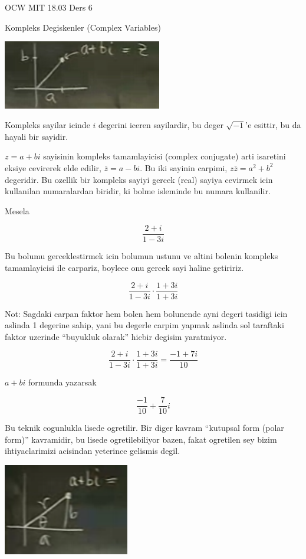 \documentclass[12pt,fleqn]{article}
\begin{document}
OCW MIT 18.03 Ders 6

Kompleks Degiskenler (Complex Variables)

\includegraphics[height=3cm]{6_1.png}

Kompleks sayilar icinde $i$ degerini iceren sayilardir, bu deger
$\sqrt{-1}$'e esittir, bu da hayali bir sayidir. 

$z=a+bi$ sayisinin kompleks tamamlayicisi (complex conjugate) arti
isaretini eksiye cevirerek elde edilir, $\bar{z}=a-bi$. Bu iki sayinin
carpimi, $z\bar{z} = a^2+b^2$ degeridir. Bu ozellik bir kompleks sayiyi
gercek (real) sayiya cevirmek icin kullanilan numaralardan biridir, ki
bolme isleminde bu numara kullanilir.

Mesela

\[ \frac{2+i}{1-3i} \]

Bu bolumu gerceklestirmek icin bolumun ustunu ve altini bolenin kompleks
tamamlayicisi ile carpariz, boylece onu gercek sayi haline getiririz.

\[ \frac{2+i}{1-3i} \cdot \frac{1+3i}{1+3i}\]

Not: Sagdaki carpan faktor hem bolen hem bolunende ayni degeri tasidigi
icin aslinda 1 degerine sahip, yani bu degerle carpim yapmak aslinda sol
taraftaki faktor uzerinde ``buyukluk olarak'' hicbir degisim yaratmiyor.

\[ \frac{2+i}{1-3i} \cdot \frac{1+3i}{1+3i} = \frac{-1+7i}{10}\]


$a+bi$ formunda yazarsak

\[ \frac{-1}{10} + \frac{7}{10}i \]

Bu teknik cogunlukla lisede ogretilir. Bir diger kavram ``kutupsal form
(polar form)'' kavramidir, bu lisede ogretilebiliyor bazen, fakat ogretilen
sey bizim ihtiyaclarimizi acisindan yeterince gelismis degil. 

\includegraphics[height=4cm]{6_2.png}
\end{document}

